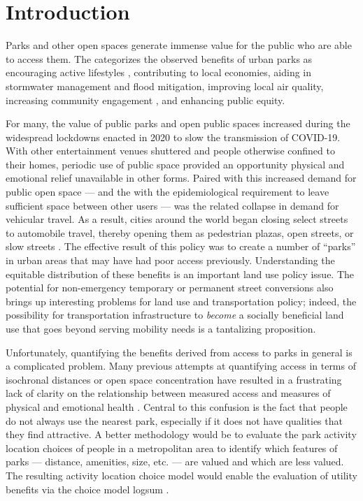 \documentclass[3p, authoryear, review]{elsarticle} %
\begin{document}
\hypertarget{intro}{%
\section{Introduction}\label{intro}}

Parks and other open spaces generate immense value for the public who are able to access them. The \citet{CityParksAlliance} categorizes the observed benefits of urban parks as encouraging active lifestyles \citep{Bancroft2015}, contributing to local economies, aiding in stormwater management and flood mitigation, improving local air quality, increasing community engagement \citep{Madzia2018}, and enhancing public equity.

For many, the value of public parks and open public spaces increased during the widespread lockdowns enacted in 2020 to slow the transmission of COVID-19. With other entertainment venues shuttered and people otherwise confined to their homes, periodic use of public space provided an opportunity physical and emotional relief unavailable in other forms. Paired with this increased demand for public open space --- and the with the epidemiological requirement to leave sufficient space between other users --- was the related collapse in demand for vehicular travel. As a result, cities around the world began closing select streets to automobile travel, thereby opening them as pedestrian plazas, open streets, or slow streets \citep{glaser_can_2021, schlossberg_rethinking_2021, combs2021shifting}. The effective result of this policy was to create a number of ``parks'' in urban areas that may have had poor access previously. Understanding the equitable distribution of these benefits is an important land use policy issue. The potential for non-emergency temporary or permanent street conversions also brings up interesting problems for land use and transportation policy; indeed, the possibility for transportation infrastructure to \emph{become} a socially beneficial land use that goes beyond serving mobility needs is a tantalizing proposition.

Unfortunately, quantifying the benefits derived from access to parks in general is a complicated problem. Many previous attempts at quantifying access in terms of isochronal distances or open space concentration have resulted in a frustrating lack of clarity on the relationship between measured access and measures of physical and emotional health \citep{Bancroft2015}. Central to this confusion is the fact that people do not always use the nearest park, especially if it does not have qualities that they find attractive. A better methodology would be to evaluate the park activity location choices of people in a metropolitan area to identify which features of parks --- distance, amenities, size, etc. --- are valued and which are less valued. The resulting activity location choice model would enable the evaluation of utility benefits via the choice model logsum \citep{Handy1997, DeJong2007}.
\end{document}
